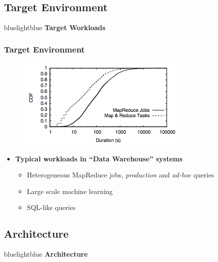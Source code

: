 \subsection{Target Environment}
\begin{frame}
 \begin{colorblock}{blue}{lightblue}{ }
    \Large \textbf{Target Workloads}
  \end{colorblock}
\end{frame}

\begin{frame}
\frametitle{Target Environment}
\begin{figure}[h]
  \centering
  \includegraphics[scale=0.6]{./figures/mesos_workload}
  \label{fig:mesos_workload}
\end{figure}

\begin{itemize}
	\item {\bf Typical workloads in ``Data Warehouse'' systems}
	\begin{itemize}
		\item Heterogeneous MapReduce jobs, {\it production} and {\it ad-hoc} queries
		\item Large scale machine learning
		\item SQL-like queries
	\end{itemize}
\end{itemize}
\end{frame}

\subsection{Architecture}
\begin{frame}
 \begin{colorblock}{blue}{lightblue}{ }
    \Large \textbf{Architecture}
  \end{colorblock}
\end{frame}

